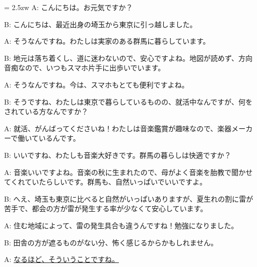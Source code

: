 \documentclass[11pt]{amsart}
\title{}
\author{}
\newenvironment{hangall}[1]{\hangindent = 2.5zw\everypar{\hangindent = 2.5zw}}{}
\begin{document}
\maketitle
\begin{hangall}{}%
A: こんにちは。お元気ですか？

B: こんにちは、最近出身の埼玉から東京に引っ越しました。

A: そうなんですね。わたしは実家のある群馬に暮らしています。

B: 地元は落ち着くし、道に迷わないので、安心ですよね。地図が読めず、方向音痴なので、いつもスマホ片手に出歩いでいます。

A: そうなんですね。今は、スマホもとても便利ですよね。

B: そうですね、わたしは東京で暮らしているものの、就活中なんですが、何をされている方なんですか？

A: 就活、がんばってくださいね！わたしは音楽鑑賞が趣味なので、楽器メーカーで働いているんです。

B: いいですね、わたしも音楽大好きです。群馬の暮らしは快適ですか？

A: 音楽いいですよね。音楽の秋に生まれたので、母がよく音楽を胎教で聞かせてくれていたらしいです。群馬も、自然いっぱいでいいですよ。

B: へえ、埼玉も東京に比べると自然がいっぱいありますが、夏生れの割に雷が苦手で、都会の方が雷が発生する率が少なくて安心しています。

A: 住む地域によって、雷の発生具合も違うんですね！勉強になりました。

B: 田舎の方が遮るものがない分、怖く感じるからかもしれません。

A: \ul{なるほど、そういうことですね。}\end{hangall}
\end{document}
